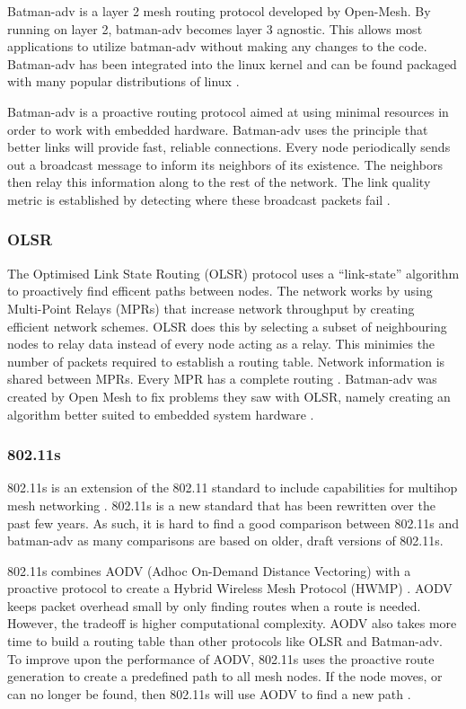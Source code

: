 Batman-adv is a layer 2 mesh routing protocol developed by Open-Mesh. By running on layer 2, batman-adv becomes layer 3 agnostic. This allows most applications to utilize batman-adv without making any changes to the code. Batman-adv has been integrated into the linux kernel and can be found packaged with many popular distributions of linux \cite{5375690}. 

Batman-adv is a proactive routing protocol aimed at using minimal resources in order to work with embedded hardware. 
Batman-adv uses the principle that better links will provide fast, reliable connections. Every node periodically sends out a broadcast message to inform its neighbors of its existence. The neighbors then relay this information along to the rest of the network. The link quality metric is established by detecting where these broadcast packets fail \cite{5375690}. 


\subsubsection{OLSR}

The Optimised Link State Routing (OLSR) protocol uses a ``link-state'' algorithm to proactively find efficent paths between nodes. The network works by using Multi-Point Relays (MPRs) that increase network throughput by creating efficient network schemes. OLSR does this by selecting a subset of neighbouring nodes to relay data instead of every node acting as a relay. This minimies the number of packets required to establish a routing table. Network information is shared between MPRs. Every MPR has a complete routing \cite{5375690}. Batman-adv was created by Open Mesh to fix problems they saw with OLSR, namely creating an algorithm better suited to embedded system hardware \cite{0032}. 

\subsubsection{802.11s}

802.11s is an extension of the 802.11 standard to include capabilities for multihop mesh networking \cite{5483777}. 802.11s is a new standard that has been rewritten over the past few years. As such, it is hard to find a good comparison between 802.11s and batman-adv as many comparisons are based on older, draft versions of 802.11s. 

802.11s combines AODV (Adhoc On-Demand Distance Vectoring) with a proactive protocol to create a Hybrid Wireless Mesh Protocol (HWMP) \cite{6379142}. AODV keeps packet overhead small by only finding routes when a route is needed. However, the tradeoff is higher computational complexity. AODV also takes more time to build a routing table than other protocols like OLSR and Batman-adv. To improve upon the performance of AODV, 802.11s uses the proactive route generation to create a predefined path to all mesh nodes. If the node moves, or can no longer be found, then 802.11s will use AODV to find a new path \cite{5483777}. 


